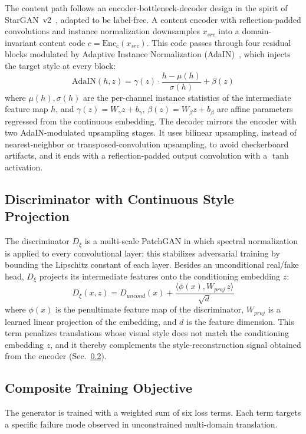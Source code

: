 \documentclass[runningheads]{llncs}
\begin{document}
The content path follows an encoder-bottleneck-decoder design in the spirit of StarGAN~v2~\cite{choi2020starganv2}, adapted to be label-free. A content encoder with reflection-padded convolutions and instance normalization downsamples $x_{src}$ into a domain-invariant content code $c = \mathrm{Enc}_c(x_{src})$. This code passes through four residual blocks modulated by Adaptive Instance Normalization (AdaIN)~\cite{huang2017adain}, which injects the target style at every block:
\begin{equation}
\mathrm{AdaIN}(h, z) = \gamma(z)\cdot\frac{h - \mu(h)}{\sigma(h)} + \beta(z)
\label{eq:adain}
\end{equation}
where $\mu(h), \sigma(h)$ are the per-channel instance statistics of the intermediate feature map $h$, and $\gamma(z) = W_\gamma z + b_\gamma$, $\beta(z) = W_\beta z + b_\beta$ are affine parameters regressed from the continuous embedding. The decoder mirrors the encoder with two AdaIN-modulated upsampling stages. It uses bilinear upsampling, instead of nearest-neighbor or transposed-convolution upsampling, to avoid checkerboard artifacts, and it ends with a reflection-padded output convolution with a $\tanh$ activation.

\subsection{Discriminator with Continuous Style Projection}
The discriminator $D_\xi$ is a multi-scale PatchGAN in which spectral normalization~\cite{miyato2018spectral} is applied to every convolutional layer; this stabilizes adversarial training by bounding the Lipschitz constant of each layer. Besides an unconditional real/fake head, $D_\xi$ projects its intermediate features onto the conditioning embedding $z$:
\begin{equation}
D_\xi(x, z) = D_{uncond}(x) + \frac{\langle \phi(x), W_{proj}\,z\rangle}{\sqrt{d}}
\label{eq:disc}
\end{equation}
where $\phi(x)$ is the penultimate feature map of the discriminator, $W_{proj}$ is a learned linear projection of the embedding, and $d$ is the feature dimension. This term penalizes translations whose visual style does not match the conditioning embedding $z$, and it thereby complements the style-reconstruction signal obtained from the encoder (Sec.~\ref{sec:objective}).

\subsection{Composite Training Objective}
\label{sec:objective}
The generator is trained with a weighted sum of six loss terms. Each term targets a specific failure mode observed in unconstrained multi-domain translation.
\end{document}
